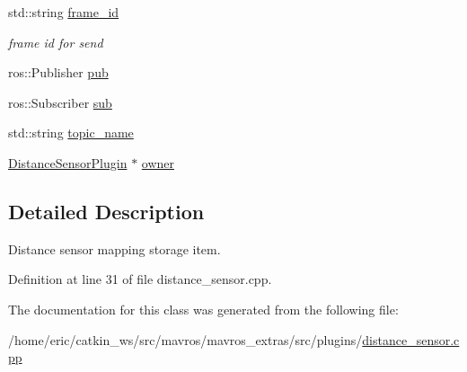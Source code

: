\begin{DoxyCompactItemize}
std\+::string \mbox{\hyperlink{group__plugin_ga6b41efde5ba3e2b5822233811dd45997}{frame\+\_\+id}}
\begin{DoxyCompactList}\small\item\em frame id for send \end{DoxyCompactList}\item 
ros\+::\+Publisher \mbox{\hyperlink{group__plugin_ga0604c0a60bf1edd2f50b3d0fe4171eec}{pub}}
\item 
ros\+::\+Subscriber \mbox{\hyperlink{group__plugin_ga59362a543db0805a4669950637451270}{sub}}
\item 
std\+::string \mbox{\hyperlink{group__plugin_gaec60262d11a7bb202f471aa4d6608615}{topic\+\_\+name}}
\item 
\mbox{\hyperlink{classmavros_1_1extra__plugins_1_1DistanceSensorPlugin}{Distance\+Sensor\+Plugin}} $\ast$ \mbox{\hyperlink{group__plugin_ga4f45665ceec645c00b6692388d8c0d51}{owner}}
\end{DoxyCompactItemize}


\subsection{Detailed Description}
Distance sensor mapping storage item. 

Definition at line 31 of file distance\+\_\+sensor.\+cpp.



The documentation for this class was generated from the following file\+:\begin{DoxyCompactItemize}
\item 
/home/eric/catkin\+\_\+ws/src/mavros/mavros\+\_\+extras/src/plugins/\mbox{\hyperlink{distance__sensor_8cpp}{distance\+\_\+sensor.\+cpp}}\end{DoxyCompactItemize}
